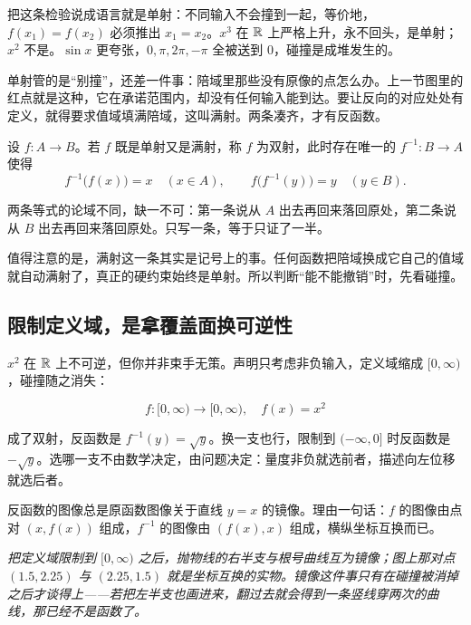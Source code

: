 把这条检验说成语言就是单射：不同输入不会撞到一起，等价地，\(f(x_1)=f(x_2)\) 必须推出 \(x_1=x_2\)。\(x^3\) 在 \(\mathbb{R}\) 上严格上升，永不回头，是单射；\(x^2\) 不是。\(\sin x\) 更夸张，\(0,\pi,2\pi,-\pi\) 全被送到 \(0\)，碰撞是成堆发生的。

单射管的是``别撞''，还差一件事：陪域里那些没有原像的点怎么办。上一节图里的红点就是这种，它在承诺范围内，却没有任何输入能到达。要让反向的对应处处有定义，就得要求值域填满陪域，这叫满射。两条凑齐，才有反函数。

\begin{definition}
设 \(f:A\to B\)。若 \(f\) 既是单射又是满射，称 \(f\) 为双射，此时存在唯一的 \(f^{-1}:B\to A\) 使得
\[
f^{-1}\bigl(f(x)\bigr)=x\quad(x\in A),
\qquad
f\bigl(f^{-1}(y)\bigr)=y\quad(y\in B).
\]
\end{definition}

两条等式的论域不同，缺一不可：第一条说从 \(A\) 出去再回来落回原处，第二条说从 \(B\) 出去再回来落回原处。只写一条，等于只证了一半。

值得注意的是，满射这一条其实是记号上的事。任何函数把陪域换成它自己的值域就自动满射了，真正的硬约束始终是单射。所以判断``能不能撤销''时，先看碰撞。

\subsection{限制定义域，是拿覆盖面换可逆性}

\(x^2\) 在 \(\mathbb{R}\) 上不可逆，但你并非束手无策。声明只考虑非负输入，定义域缩成 \([0,\infty)\)，碰撞随之消失：

\[
f:[0,\infty)\to[0,\infty),\quad f(x)=x^2
\]

成了双射，反函数是 \(f^{-1}(y)=\sqrt y\)。换一支也行，限制到 \((-\infty,0]\) 时反函数是 \(-\sqrt y\)。选哪一支不由数学决定，由问题决定：量度非负就选前者，描述向左位移就选后者。

反函数的图像总是原函数图像关于直线 \(y=x\) 的镜像。理由一句话：\(f\) 的图像由点对 \((x,f(x))\) 组成，\(f^{-1}\) 的图像由 \((f(x),x)\) 组成，横纵坐标互换而已。

\begin{center}

\emph{把定义域限制到 \([0,\infty)\) 之后，抛物线的右半支与根号曲线互为镜像；图上那对点 \((1.5,2.25)\) 与 \((2.25,1.5)\) 就是坐标互换的实物。镜像这件事只有在碰撞被消掉之后才谈得上——若把左半支也画进来，翻过去就会得到一条竖线穿两次的曲线，那已经不是函数了。}
\end{center}

